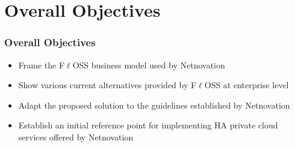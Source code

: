 \section{Overall Objectives}

\begin{frame}%
\frametitle{Overall Objectives}

\begin{itemize}
  \item Frame the F$\ell$OSS business model used by Netnovation
  \item Show various current alternatives provided by F$\ell$OSS at enterprise level
  \item Adapt the proposed solution to the guidelines established by Netnovation
  \item Establish an initial reference point for implementing HA private cloud services offered by Netnovation
\end{itemize}

\end{frame}